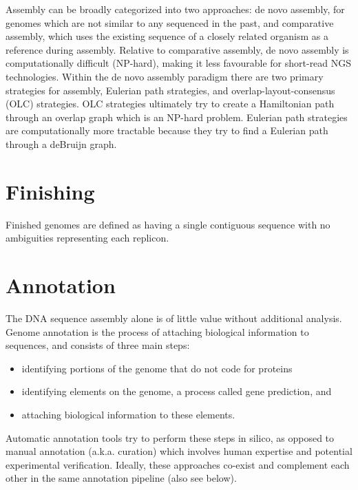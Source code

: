 Assembly can be broadly categorized into two approaches: de novo assembly, for genomes which are not similar to any sequenced in the past, and comparative assembly, which uses the existing sequence of a closely related organism as a reference during assembly. Relative to comparative assembly, de novo assembly is computationally difficult (NP-hard), making it less favourable for short-read NGS technologies. Within the de novo assembly paradigm there are two primary strategies for assembly, Eulerian path strategies, and overlap-layout-consensus (OLC) strategies. OLC strategies ultimately try to create a Hamiltonian path through an overlap graph which is an NP-hard problem. Eulerian path strategies are computationally more tractable because they try to find a Eulerian path through a deBruijn graph.

\hypertarget{finishing}{%
\section{Finishing}\label{finishing}}

Finished genomes are defined as having a single contiguous sequence with no ambiguities representing each replicon.

\hypertarget{annotation}{%
\section{Annotation}\label{annotation}}

The DNA sequence assembly alone is of little value without additional analysis. Genome annotation is the process of attaching biological information to sequences, and consists of three main steps:

\begin{itemize}
\tightlist
\item
  identifying portions of the genome that do not code for proteins
\item
  identifying elements on the genome, a process called gene prediction, and
\item
  attaching biological information to these elements.
\end{itemize}

Automatic annotation tools try to perform these steps in silico, as opposed to manual annotation (a.k.a. curation) which involves human expertise and potential experimental verification. Ideally, these approaches co-exist and complement each other in the same annotation pipeline (also see below).

